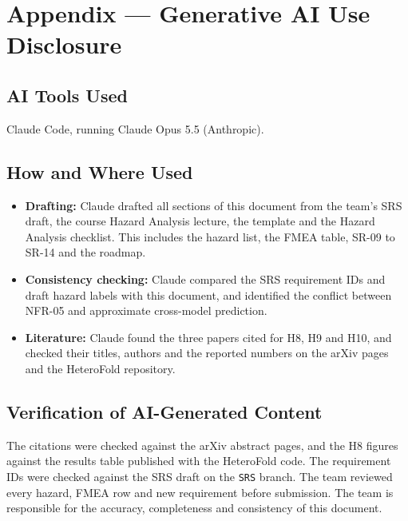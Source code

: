 \documentclass{article}
\begin{document}



\newpage{}

\section{Appendix --- Generative AI Use Disclosure}

\subsection{AI Tools Used}

Claude Code, running Claude Opus 5.5 (Anthropic).

\subsection{How and Where Used}

\begin{itemize}
  \item \textbf{Drafting:} Claude drafted all sections of this document from
  the team's SRS draft, the course Hazard Analysis lecture, the template and
  the Hazard Analysis checklist. This includes the hazard list, the FMEA
  table, SR-09 to SR-14 and the roadmap.
  \item \textbf{Consistency checking:} Claude compared the SRS requirement
  IDs and draft hazard labels with this document, and identified the
  conflict between NFR-05 and approximate cross-model prediction.
  \item \textbf{Literature:} Claude found the three papers cited for H8,
  H9 and H10, and checked their titles, authors and the reported numbers on
  the arXiv pages and the HeteroFold repository.
\end{itemize}

\subsection{Verification of AI-Generated Content}

The citations were checked against the arXiv abstract pages, and the
H8 figures against the results table published with the HeteroFold code.
The requirement IDs were checked against the SRS draft on the \texttt{SRS}
branch. The team reviewed every hazard, FMEA row and new requirement
before submission. The team is
responsible for the accuracy, completeness and consistency of this
document.

\newpage{}
\end{document}
